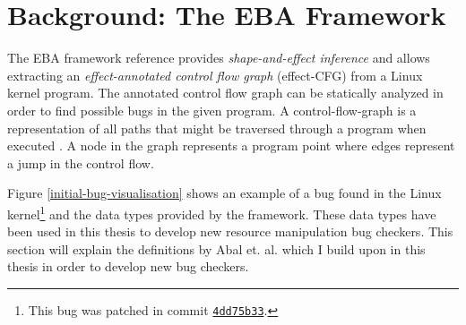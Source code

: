 \section{Background: The EBA Framework}
\label{background-section}
The EBA framework reference provides \textit{shape-and-effect inference} and allows extracting an \textit{effect-annotated control flow graph} (effect-CFG) from a Linux kernel program. The annotated control flow graph can be statically analyzed in order to find possible bugs in the given program. A control-flow-graph is a representation of all paths that might be traversed through a program when executed \cite{cfg}. A node in the graph represents a program point where edges represent a jump in the control flow. 

\newpar Figure \ref{initial-bug-visualisation} shows an example of a bug found in the Linux kernel\footnote{This bug was patched in commit \href{https://github.com/torvalds/linux/commit/4dd75b33}{\texttt{4dd75b33}}.} and the data types provided by the framework. These data types have been used in this thesis to develop new resource manipulation bug checkers. This section will explain the definitions by Abal et. al. \cite{Abal2017EffectiveBF} which I build upon in this thesis in order to develop new bug checkers. 


